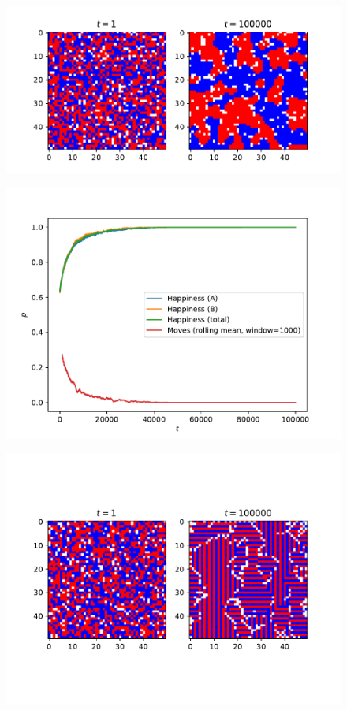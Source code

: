 \documentclass[a4paper, 12pt]{article}
\begin{document}

\begin{figure}[h!]
    \includegraphics[width=\linewidth]{../Schelling-Model/town.pdf}
\end{figure}

\begin{figure}[h!]
    \includegraphics[width=\linewidth]{../Schelling-Model/happiness.pdf}
\end{figure}

\newpage

\begin{figure}[h!]
    \centering
    \includegraphics[width=0.9\linewidth]{../Anti-Gregarious/town.pdf}
\end{figure}
\end{document}
